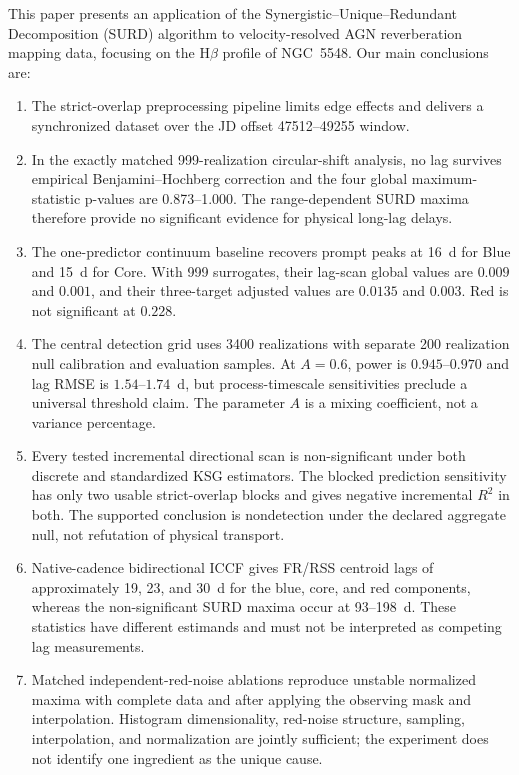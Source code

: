 \documentclass[fleqn,usenatbib]{mnras}
\begin{document}
This paper presents an application of the Synergistic--Unique--Redundant Decomposition (SURD) algorithm to velocity-resolved AGN reverberation mapping data, focusing on the H\(\beta\) profile of NGC~5548. Our main conclusions are:
\begin{enumerate}
\item The strict-overlap preprocessing pipeline limits edge effects and delivers a synchronized dataset over the JD offset 47512--49255 window.
\item In the exactly matched 999-realization circular-shift analysis, no lag survives empirical Benjamini--Hochberg correction and the four global maximum-statistic p-values are 0.873--1.000. The range-dependent SURD maxima therefore provide no significant evidence for physical long-lag delays.
\item The one-predictor continuum baseline recovers prompt peaks at 16~d for Blue and 15~d for Core. With 999 surrogates, their lag-scan global values are $0.009$ and $0.001$, and their three-target adjusted values are $0.0135$ and $0.003$. Red is not significant at $0.228$.
\item The central detection grid uses 3400 realizations with separate 200 realization null calibration and evaluation samples. At $A=0.6$, power is $0.945$--$0.970$ and lag RMSE is $1.54$--$1.74$~d, but process-timescale sensitivities preclude a universal threshold claim. The parameter $A$ is a mixing coefficient, not a variance percentage.
\item Every tested incremental directional scan is non-significant under both discrete and standardized KSG estimators. The blocked prediction sensitivity has only two usable strict-overlap blocks and gives negative incremental $R^2$ in both. The supported conclusion is nondetection under the declared aggregate null, not refutation of physical transport.
\item Native-cadence bidirectional ICCF gives FR/RSS centroid lags of approximately 19, 23, and 30~d for the blue, core, and red components, whereas the non-significant SURD maxima occur at 93--198~d. These statistics have different estimands and must not be interpreted as competing lag measurements.
\item Matched independent-red-noise ablations reproduce unstable normalized maxima with complete data and after applying the observing mask and interpolation. Histogram dimensionality, red-noise structure, sampling, interpolation, and normalization are jointly sufficient; the experiment does not identify one ingredient as the unique cause.

\end{enumerate}
\end{document}
